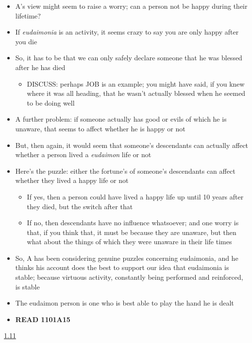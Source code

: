 \documentclass[11pt]{article}
\begin{document}
\begin{itemize}\item{A's view might seem to raise a worry; can a person not be happy during their lifetime?}\item{If \emph{eudaimonia} is an activity, it seems crazy to say you are only happy after you die}\item{So, it has to be that we can only safely declare someone that he was blessed after he has died}\begin{itemize}\item{DISCUSS: perhaps JOB is an example; you might have said, if you knew where it was all heading, that he wasn't actually blessed when he seemed to be doing well}\end{itemize}\item{A further problem: if someone actually has good or evils of which he is unaware, that seems to affect whether he is happy or not}\item{But, then again, it would seem that someone's descendants can actually affect whether a person lived a \emph{eudaimon} life or not}\item{Here's the puzzle: either the fortune's of someone's descendants can affect whether they lived a happy life or not}\begin{itemize}\item{If yes, then a person could have lived a happy life up until 10 years after they died, but the switch after that}\item{If no, then descendants have no influence whatsoever; and one worry is that, if you think that, it must be because they are unaware, but then what about the things of which they were unaware in their life times}\end{itemize}

\item{So, A has been considering genuine puzzles concerning eudaimonia, and he thinks his account does the best to support our idea that eudaimonia is stable; because virtuous activity, constantly being performed and reinforced, is stable}\item{The eudaimon person is one who is best able to play the hand he is dealt}\item{\textbf{READ 1101A15}}

\end{itemize}

\noindent\underline{1.11}
\end{document}
